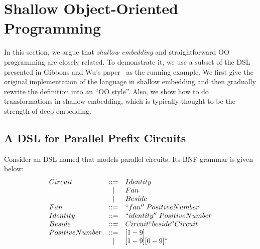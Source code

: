 \section{Shallow Object-Oriented Programming}

\begin{comment}
Weixin writes this part.

Argue that shallow embeddings and straightforward OO 
programs are essentially the same thing. 

Start from a simple shallow DSL in Haskell, 
and iterate throught it until you reach a form 
that looks like an OO program.

Show how todo transformations in Shallow embeddings
using the insight of how to do transformations in OO
programs.

Show the correponding Java programs and the Java program 
with transformation that we can port back to Haskell.

Shallow embedding interpreter pattern
Deep embedding visitor pattern
\end{comment}

In this section, we argue that \emph{shallow embedding} and straightforward OO
programming are closely related. To demonstrate it, we use a subset
of the DSL presented in Gibbons and Wu's paper~\cite{} as the running example.
We first give the original implementation of the language in shallow embedding
and then gradually rewrite the definition into an ``OO style''. Also, we show how to do
transformations in shallow embedding, which is typically thought to be the
strength of deep embedding.

\subsection{A DSL for Parallel Prefix Circuits}
Consider an DSL named \dsl that models parallel circuits.
Its BNF grammar is given below:
$$
\begin{array}{lcl}
Circuit & ::= & Identity \\
 & \mid & Fan \\
 & \mid & Beside \\
Fan & ::= & ``fan''\; PositiveNumber \\
Identity & ::= & ``identity''\;  PositiveNumber \\
Beside & ::= & Circuit ``beside'' Circuit \\
PositiveNumber & ::= & [1-9] \\
     & \mid & [1-9][0-9]^* \\
\end{array}
$$

